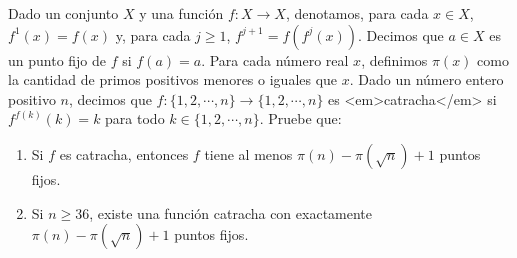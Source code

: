 Dado un conjunto $X$ y una función $f : X \rightarrow X$, denotamos, para cada $x \in X$, $f^1(x) = f(x)$ y, para cada $j \geq 1$, $f^{j+1} = f(f^j(x))$. Decimos que $a \in X$ es un punto fijo de $f$ si $f(a) = a$. Para cada número real $x$, definimos $\pi (x)$ como la cantidad de primos positivos menores o iguales que $x$. Dado un número entero positivo $n$, decimos que $f : \{ 1,2, \cdots , n \} \rightarrow \{ 1,2, \cdots , n \}$ es <em>catracha</em> si $f^{f(k)}(k) = k$ para todo $k \in \{ 1,2, \cdots ,n\}$. Pruebe que:
\begin{enumerate}
   \item Si $f$ es catracha, entonces $f$ tiene al menos $\pi (n)- \pi (\sqrt{n})+1$ puntos fijos.
   \item Si $n \geq 36$, existe una función catracha con exactamente $\pi (n) - \pi (\sqrt{n})+1$ puntos fijos.
 \end{enumerate} 
